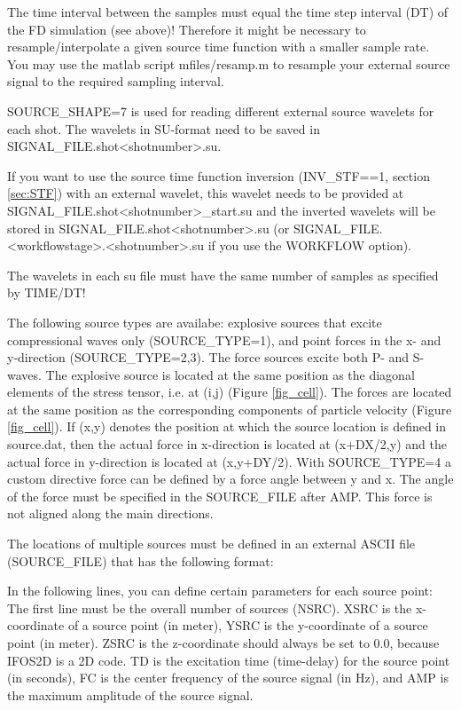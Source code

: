 The time interval between the samples must equal the time step interval (DT) of the FD simulation (see above)! Therefore it might be necessary to resample/interpolate a given source time function with a smaller sample rate. You may use the matlab script mfiles/resamp.m to resample your external source signal to the required sampling interval.
\newline

SOURCE\_SHAPE=7 is used for reading different external source wavelets for each shot. The wavelets in SU-format need to be saved in SIGNAL\_FILE.shot<shotnumber>.su.

If you want to use the source time function inversion (INV\_STF==1, section \ref{sec:STF}) with an external wavelet, this wavelet needs to be provided at SIGNAL\_FILE.shot<shotnumber>\_start.su and the inverted wavelets will be stored in SIGNAL\_FILE.shot<shotnumber>.su (or SIGNAL\_FILE.<workflowstage>.<shotnumber>.su if you use the WORKFLOW option).

The wavelets in each su file must have the same number of samples as specified by TIME/DT!
\newline

The following source types are availabe: explosive sources that excite compressional waves only (SOURCE\_TYPE=1), and point forces in the x- and y-direction (SOURCE\_TYPE=2,3).
The force sources excite both P- and S-waves. The explosive source is located at the same position as the diagonal elements of the stress tensor, i.e. at (i,j) (Figure \ref{fig_cell}).
The forces are located at the same position as the corresponding components of particle velocity (Figure \ref{fig_cell}). If (x,y) denotes the position at which the source location is defined in source.dat, then the actual force in x-direction is located at (x+DX/2,y) and the actual force in y-direction is located at (x,y+DY/2). With SOURCE\_TYPE=4 a custom directive force can be defined by a force angle between y and x. The angle of the force must be specified in the SOURCE\_FILE after AMP. This force is not aligned along the main directions.
\newline

The locations of multiple sources must be defined in an external ASCII file (SOURCE\_FILE) that has the following format:
{\color{blue}{\begin{verbatim}
NSRC
  % 	XSRC		ZSRC		YSRC		TD		FC		AMP  	SOURCE_AZIMUTH		SOURCE_TYPE	(NSRC lines)
\end{verbatim}}}

In the following lines, you can define certain parameters for each source point:\\
The first line must be the overall number of sources (NSRC). XSRC is the x-coordinate of a source point (in meter), YSRC is the y-coordinate of a source point (in meter). ZSRC is the z-coordinate should always be set to 0.0, because IFOS2D is a 2D code. TD is the excitation time (time-delay) for the source point (in seconds), FC is the center frequency of the source signal (in Hz), and AMP is the maximum amplitude of the source signal.
\newline

